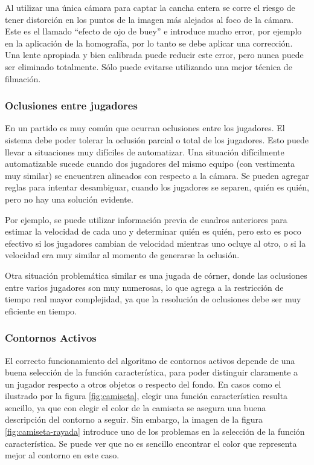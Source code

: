 \documentclass[a4paper,10pt]{article}
\begin{document}
Al utilizar una única cámara para captar la cancha entera se corre el riesgo de
tener distorción en los puntos de la imagen más alejados al foco de la cámara.
Este es el llamado ``efecto de ojo de buey'' e introduce mucho error, por ejemplo
en la aplicación de la homografía, por lo
tanto se debe aplicar una corrección. Una lente apropiada y bien calibrada
puede reducir este error, pero nunca puede ser eliminado totalmente. Sólo
puede evitarse utilizando una mejor técnica de filmación.

\subsubsection{Oclusiones entre jugadores}

En un partido es muy común que ocurran oclusiones entre los jugadores. El
sistema debe poder tolerar la oclusión parcial o total de los jugadores.
Esto puede llevar a situaciones muy difíciles de automatizar. Una situación
difícilmente automatizable sucede cuando dos jugadores del mismo equipo (con
vestimenta muy similar) se encuentren alineados con respecto a la cámara.
Se pueden agregar reglas para intentar desambiguar, cuando los jugadores se
separen, quién es quién, pero no hay una solución evidente.

Por ejemplo, se puede utilizar información previa de cuadros anteriores para
estimar la velocidad de cada uno y determinar quién es quién, pero esto
es poco efectivo si los jugadores cambian de velocidad mientras uno ocluye
al otro, o si la velocidad era muy similar al momento de generarse la oclusión.

Otra situación problemática similar es una jugada de córner, donde las
oclusiones entre varios jugadores son muy numerosas, lo que agrega a la
restricción de tiempo real mayor complejidad, ya que la resolución de
oclusiones debe ser muy eficiente en tiempo.

\subsubsection{Contornos Activos}

El correcto funcionamiento del algoritmo de contornos
activos\cite{fast-level-set} depende de una buena selección de la función
característica, para poder distinguir claramente a un jugador respecto a otros
objetos o respecto del fondo. En casos como el ilustrado por la figura
\ref{fig:camiseta}, elegir una función característica resulta sencillo, ya que
con elegir el color de la camiseta se asegura una buena descripción del contorno
a seguir. Sin embargo, la imagen de la figura \ref{fig:camiseta-rayada} introduce
uno de los problemas en la selección de la función característica. Se puede ver
que no es sencillo encontrar el color que representa mejor al contorno en este caso.
\end{document}
